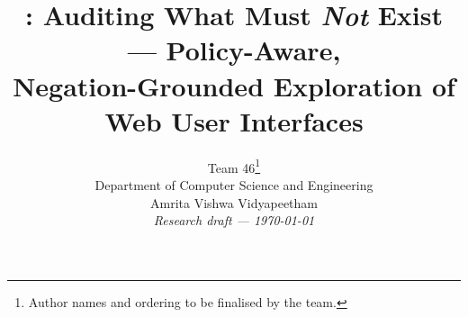 \documentclass[10pt,twocolumn,letterpaper]{article}
\title{\sys: Auditing What Must \emph{Not} Exist --- Policy-Aware,\\
Negation-Grounded Exploration of Web User Interfaces}
\author{Team 46\thanks{Author names and ordering to be finalised by the team.}\\
Department of Computer Science and Engineering\\
Amrita Vishwa Vidyapeetham\\
\small\textit{Research draft --- \today}}
\date{}
\begin{document}
\maketitle











\balance


\end{document}
